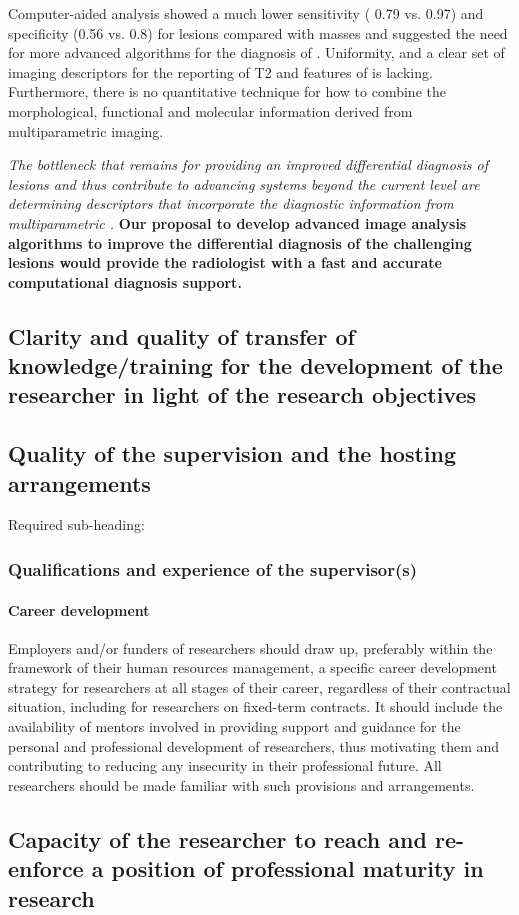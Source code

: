  Computer-aided analysis showed a much lower
sensitivity ( 0.79 vs. 0.97) and specificity (0.56 vs. 0.8) for \nmle lesions
compared with masses and suggested the need for more advanced
algorithms for the diagnosis of \nmle \cite{Newell,Vag,Jansen1,Jansen2}.
Uniformity, and a clear set of imaging descriptors for the reporting of T2 and \dwi features of \nmle is lacking.
Furthermore, there is no quantitative technique  for how to combine the morphological, functional and
molecular information derived from multiparametric imaging.

{\it The bottleneck that remains for providing an improved
differential diagnosis of \nmle lesions and thus
contribute to advancing \cad systems beyond the current  level are
determining
descriptors that incorporate  the diagnostic information from
multiparametric \mri.}
 {\bf Our proposal to develop advanced image analysis algorithms to improve the differential diagnosis
 of the challenging \nmle lesions
would provide the radiologist with a fast and accurate computational diagnosis support.}
\subsection{Clarity and quality of transfer of knowledge/training for the development of the researcher in light of the research objectives}
\label{sec:transfer}


\subsection{Quality of the supervision and the hosting arrangements}
\label{sec:supervision}

Required sub-heading:
\subsubsection*{Qualifications and experience of the supervisor(s)}


\paragraph{Career development}
Employers and/or funders of researchers should draw up, preferably within the framework of their human resources management, a specific career development strategy for researchers at all stages of their career, regardless of their contractual situation, including for researchers on fixed-term contracts. It should include the availability of mentors involved in providing support and guidance for the personal and professional development of researchers, thus motivating them and contributing to reducing any insecurity in their professional future. All researchers should be made familiar with such provisions and arrangements.

\subsection{Capacity of the researcher to reach and re-enforce a position of professional maturity in research}
\label{sec:maturity}

